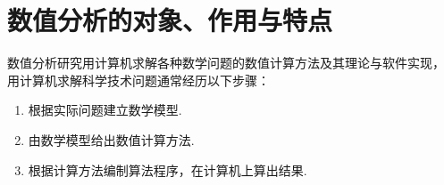 \section{数值分析的对象、作用与特点}
数值分析研究用计算机求解各种数学问题的数值计算方法及其理论与软件实现，
用计算机求解科学技术问题通常经历以下步骤：
\begin{enumerate}
	\item 根据实际问题建立数学模型.
	\item 由数学模型给出数值计算方法.
	\item 根据计算方法编制算法程序，在计算机上算出结果.
\end{enumerate}
